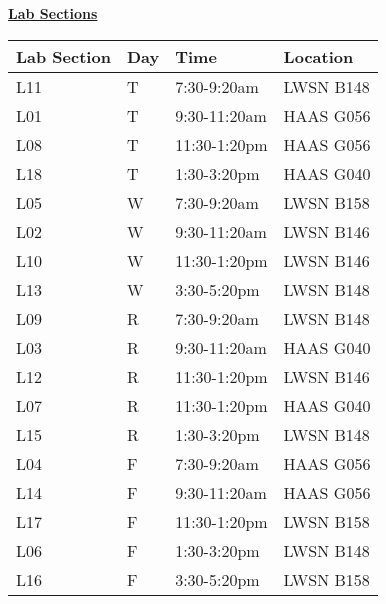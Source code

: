 \documentclass[S17-Final.tex]{subfiles}
\begin{document}
 
\begin{center}
\textbf{\underline{\Huge{Lab Sections}}}
\end{center}
\begin{table}[!htb]
\renewcommand{\arraystretch}{2}
\centering
\begin{tabular}{|l|l|l|l|}\hline 
\textbf{Lab Section} & \textbf{Day} & \textbf{Time} & \textbf{Location} \\ \hline
L11 & T & 7:30-9:20am &  LWSN B148 \\ \hline
L01 & T & 9:30-11:20am & HAAS G056 \\ \hline
L08 & T & 11:30-1:20pm & HAAS G056 \\ \hline
L18 & T & 1:30-3:20pm & HAAS G040 \\ \hline
L05 & W & 7:30-9:20am & LWSN B158 \\ \hline
L02 & W & 9:30-11:20am & LWSN B146 \\ \hline
L10 & W & 11:30-1:20pm & LWSN B146 \\ \hline
L13 & W & 3:30-5:20pm & LWSN B148 \\ \hline
L09 & R & 7:30-9:20am & LWSN B148 \\ \hline
L03 & R & 9:30-11:20am & HAAS G040 \\ \hline
L12 & R & 11:30-1:20pm & LWSN B146 \\ \hline
L07 & R & 11:30-1:20pm & HAAS G040 \\ \hline
L15 & R & 1:30-3:20pm & LWSN B148 \\ \hline
L04 & F & 7:30-9:20am & HAAS G056 \\ \hline
L14 & F & 9:30-11:20am & HAAS G056 \\ \hline
L17 & F & 11:30-1:20pm & LWSN B158 \\ \hline
L06 & F & 1:30-3:20pm & LWSN B148 \\ \hline
L16 & F & 3:30-5:20pm & LWSN B158 \\ \hline
\end{tabular}
\end{table}
\end{document}
